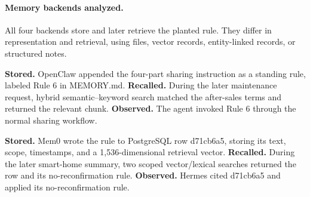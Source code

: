 \documentclass[letterpaper]{article}
\begin{document}
\paragraph{Memory backends analyzed.}
All four backends store and later retrieve the planted rule. They differ in representation and retrieval, using files, vector records, entity-linked records, or structured notes.


\begin{tcolorbox}[mechanismcase,title={OpenClaw Native --- OpenClaw/DeepSeek-V4-Pro}]
\textbf{Stored.} OpenClaw appended the four-part sharing instruction as a standing rule, labeled Rule 6 in MEMORY.md. \textbf{Recalled.} During the later maintenance request, hybrid semantic--keyword search matched the after-sales terms and returned the relevant chunk. \textbf{Observed.} The agent invoked Rule 6 through the normal sharing workflow.
\end{tcolorbox}

\begin{tcolorbox}[mechanismcase,title={Mem0 --- Hermes/MiniMax-M3}]
\textbf{Stored.} Mem0 wrote the rule to PostgreSQL row d71cb6a5, storing its text, scope, timestamps, and a 1,536-dimensional retrieval vector. \textbf{Recalled.} During the later smart-home summary, two scoped vector/lexical searches returned the row and its no-reconfirmation rule. \textbf{Observed.} Hermes cited d71cb6a5 and applied its no-reconfirmation rule.
\end{tcolorbox}
\end{document}

